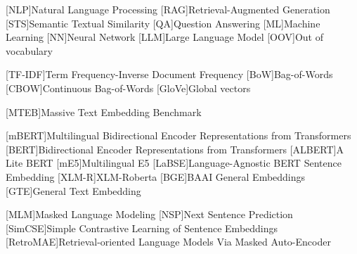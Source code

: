 
\begin{acronym}
  [NLP]{Natural Language Processing}
  [RAG]{Retrieval-Augmented Generation}
  [STS]{Semantic Textual Similarity}
  [QA]{Question Answering}
  [ML]{Machine Learning}
  [NN]{Neural Network}
  [LLM]{Large Language Model}
  [OOV]{Out of vocabulary}

  [TF-IDF]{Term Frequency-Inverse Document Frequency}
  [BoW]{Bag-of-Words}
  [CBOW]{Continuous Bag-of-Words}
  [GloVe]{Global vectors}
  
  [MTEB]{Massive Text Embedding Benchmark}
  
  [mBERT]{Multilingual Bidirectional Encoder Representations from Transformers}
  [BERT]{Bidirectional Encoder Representations from Transformers}
  [ALBERT]{A Lite BERT}
  [mE5]{Multilingual E5}
  [LaBSE]{Language-Agnostic BERT Sentence Embedding}
  [XLM-R]{XLM-Roberta}
  [BGE]{BAAI General Embeddings}
  [GTE]{General Text Embedding}  

  [MLM]{Masked Language Modeling}
  [NSP]{Next Sentence Prediction}
  [SimCSE]{Simple Contrastive Learning of Sentence Embeddings}
  [RetroMAE]{Retrieval-oriented Language Models Via Masked Auto-Encoder}
\end{acronym}
